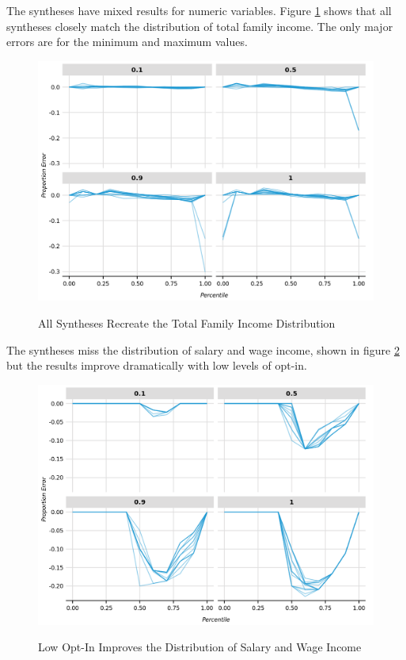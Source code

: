 \documentclass[
]{urban-formatting}
\begin{document}
The syntheses have mixed results for numeric variables. Figure
\ref{fig:family-income} shows that all syntheses closely match the
distribution of total family income. The only major errors are for the
minimum and maximum values.

\begin{figure}[!htb]
    \caption{All Syntheses Recreate the Total Family Income Distribution}
    \centering
    \includegraphics[width=6.5in]{../analysis/figures/percentiles-2.png}
    \label{fig:family-income}
\end{figure}

The syntheses miss the distribution of salary and wage income, shown in
figure \ref{fig:wage-income} but the results improve dramatically with
low levels of opt-in.

\begin{figure}[!htb]
    \caption{Low Opt-In Improves the Distribution of Salary and Wage Income}
    \centering
    \includegraphics[width=6.5in]{../analysis/figures/percentiles-1.png}
    \label{fig:wage-income}
\end{figure}
\end{document}
